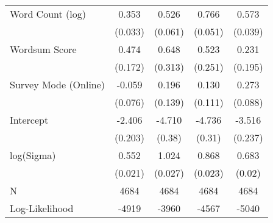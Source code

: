 \begin{table}[ht]
\begin{tabular}{lcccc}
  Word Count (log) &  0.353 &  0.526 &  0.766 &  0.573 \\ 
   & (0.033) & (0.061) & (0.051) & (0.039) \\ 
  Wordsum Score &  0.474 &  0.648 &  0.523 &  0.231 \\ 
   & (0.172) & (0.313) & (0.251) & (0.195) \\ 
  Survey Mode (Online) & -0.059 &  0.196 &  0.130 &  0.273 \\ 
   & (0.076) & (0.139) & (0.111) & (0.088) \\ 
  Intercept & -2.406 & -4.710 & -4.736 & -3.516 \\ 
   & (0.203) & (0.38) & (0.31) & (0.237) \\ 
  log(Sigma) &  0.552 &  1.024 &  0.868 &  0.683 \\ 
   & (0.021) & (0.027) & (0.023) & (0.02) \\ 
   \hline
N & 4684 & 4684 & 4684 & 4684 \\ 
  Log-Likelihood & -4919 & -3960 & -4567 & -5040 \\ 
   \hline
\end{tabular}
\endgroup
\end{table}
